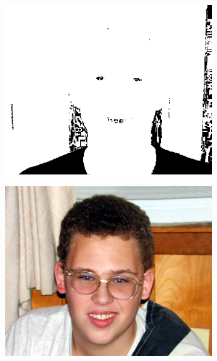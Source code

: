 \begin{figure}[h]
\begin{subfigure}[b]{0.18\textwidth}
         \centering
         \includegraphics[width=\textwidth]{images/results/base/im00060_dyc_base_ecu.png}
     \end{subfigure}
     \begin{subfigure}[b]{0.18\textwidth}
         \centering
         \includegraphics[width=\textwidth]{images/results/base/im00077_x.jpg}
     \end{subfigure}
     \hfill
     \begin{subfigure}[b]{0.18\textwidth}
         \centering

\end{subfigure}
\end{figure}
